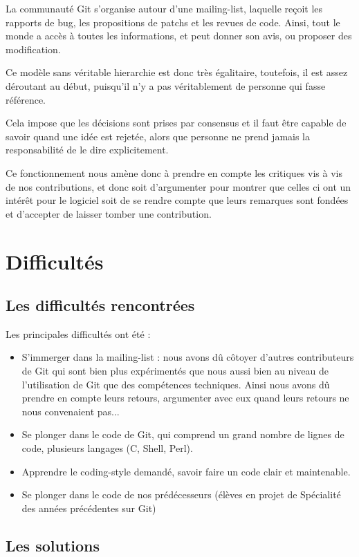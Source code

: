 \documentclass[a4paper, 12pt]{article}
\begin{document}
La communauté Git s'organise autour d'une mailing-list, laquelle reçoit les rapports de bug, les propositions de patchs et les revues de code. Ainsi, tout le monde a accès à toutes les informations, et peut donner son avis, ou proposer des modification.

Ce modèle sans véritable hierarchie est donc très égalitaire, toutefois, il est assez déroutant au début, puisqu'il n'y a pas véritablement de personne qui fasse référence.

Cela impose que les décisions sont prises par consensus et il faut être capable de savoir quand une idée est rejetée, alors que personne ne prend jamais la responsabilité de le dire explicitement.

Ce fonctionnement nous amène donc à prendre en compte les critiques vis à vis de nos contributions, et donc soit d'argumenter pour montrer que celles ci ont un intérêt pour le logiciel soit de se rendre compte que leurs remarques sont fondées et d'accepter de laisser tomber une contribution.

\section{Difficultés}

\subsection{Les difficultés rencontrées}

Les principales difficultés ont été :
\begin{itemize}
\item S'immerger dans la mailing-list : nous avons dû côtoyer d'autres contributeurs de Git qui sont bien plus expérimentés que nous aussi bien au niveau de l'utilisation de Git que des compétences techniques. Ainsi nous avons dû prendre en compte leurs retours, argumenter avec eux quand leurs retours ne nous convenaient pas...
\item Se plonger dans le code de Git, qui comprend un grand nombre de lignes de code, plusieurs langages (C, Shell, Perl).
\item Apprendre le coding-style demandé, savoir faire un code clair et maintenable.
\item Se plonger dans le code de nos prédécesseurs (élèves en projet de Spécialité des années précédentes sur Git)
\end{itemize}

\subsection{Les solutions}
\end{document}
